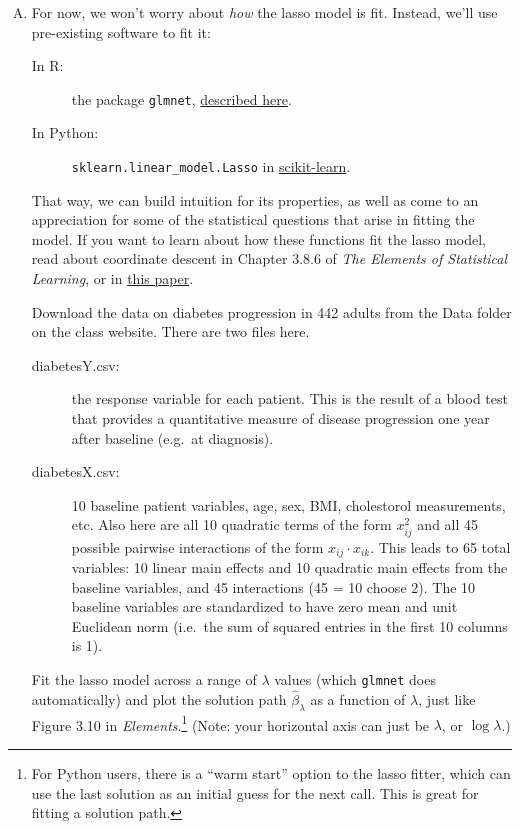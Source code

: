 \documentclass{article}
\begin{document}
\begin{enumerate}[(A)]

\item For now, we won't worry about \textit{how} the lasso model is fit.  Instead, we'll use pre-existing software to fit it:
\begin{description}
\item[In R:] the package \verb|glmnet|, \href{https://web.stanford.edu/~hastie/glmnet/glmnet_alpha.html}{described here}.
\item[In Python:] \verb|sklearn.linear_model.Lasso| in \href{http://scikit-learn.org/stable/index.html}{scikit-learn}.
\end{description}
That way, we can build intuition for its properties, as well as come to an appreciation for some of the statistical questions that arise in fitting the model.  If you want to learn about how these functions fit the lasso model, read about coordinate descent in Chapter 3.8.6 of \textit{The Elements of Statistical Learning}, or in \href{http://arxiv.org/pdf/0708.1485.pdf}{this paper}.

Download the data on diabetes progression in 442 adults from the Data folder on the class website.  There are two files here.
\begin{description}
\item[diabetesY.csv:] the response variable for each patient.  This is the result of a blood test that provides a quantitative measure of disease progression one year after baseline (e.g.~at diagnosis).
\item[diabetesX.csv:] 10 baseline patient variables, age, sex, BMI, cholestorol measurements, etc.  Also here are all 10 quadratic terms of the form $x_{ij}^2$ and all 45 possible pairwise interactions of the form $x_{ij} \cdot x_{ik}$.  This leads to 65 total variables: 10 linear main effects and 10 quadratic main effects from the baseline variables, and 45 interactions (45 = 10 choose 2).  The 10  baseline variables are standardized to have zero mean and unit Euclidean norm (i.e.~the sum of squared entries in the first 10 columns is 1).
\end{description}

Fit the lasso model across a range of $\lambda$ values (which \verb|glmnet| does automatically) and plot the solution path $\hat{\beta}_{\lambda}$ as a function of $\lambda$, just like Figure 3.10 in \textit{Elements}.\footnote{For Python users, there is a ``warm start'' option to the lasso fitter, which can use the last solution as an initial guess for the next call.  This is great for fitting a solution path.}  (Note: your horizontal axis can just be $\lambda$, or $\log \lambda$.)


\end{enumerate}
\end{document}
